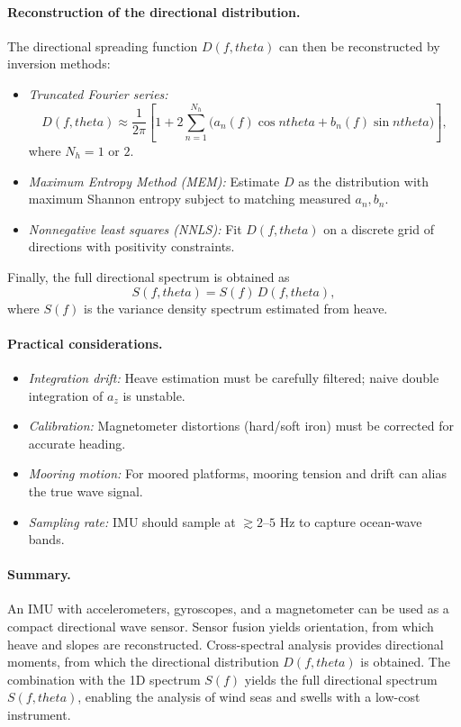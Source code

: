 \documentclass[journal,10pt,twocolumn]{IEEEtran}
\def\theta{theta}%
\begin{document}
    \paragraph{Reconstruction of the directional distribution.}
    The directional spreading function $D(f,\theta)$ can then be reconstructed by inversion methods:
    \begin{itemize}[leftmargin=1.4em]
        \item \emph{Truncated Fourier series:}
        \begin{equation}
            D(f,\theta) \approx \frac{1}{2\pi}\left[1 + 2\sum_{n=1}^{N_h}\big(a_n(f)\cos n\theta + b_n(f)\sin n\theta\big)\right],
        \end{equation}
        where $N_h=1$ or $2$.
        \item \emph{Maximum Entropy Method (MEM):} Estimate $D$ as the distribution with maximum Shannon entropy subject to matching measured $a_n,b_n$.
        \item \emph{Nonnegative least squares (NNLS):} Fit $D(f,\theta)$ on a discrete grid of directions with positivity constraints.
    \end{itemize}
    Finally, the full directional spectrum is obtained as
    \begin{equation}
        S(f,\theta) = S(f)\, D(f,\theta),
    \end{equation}
    where $S(f)$ is the variance density spectrum estimated from heave.

    \paragraph{Practical considerations.}
    \begin{itemize}[leftmargin=1.4em]
        \item \emph{Integration drift:} Heave estimation must be carefully filtered; naive double integration of $a_z$ is unstable.
        \item \emph{Calibration:} Magnetometer distortions (hard/soft iron) must be corrected for accurate heading.
        \item \emph{Mooring motion:} For moored platforms, mooring tension and drift can alias the true wave signal.
        \item \emph{Sampling rate:} IMU should sample at $\gtrsim 2$--$5$ Hz to capture ocean-wave bands.
    \end{itemize}

    \paragraph{Summary.}
    An IMU with accelerometers, gyroscopes, and a magnetometer can be used as a compact directional wave sensor. Sensor fusion yields orientation, from which heave and slopes are reconstructed. Cross-spectral analysis provides directional moments, from which the directional distribution $D(f,\theta)$ is obtained. The combination with the 1D spectrum $S(f)$ yields the full directional spectrum $S(f,\theta)$, enabling the analysis of wind seas and swells with a low-cost instrument.
\end{document}
